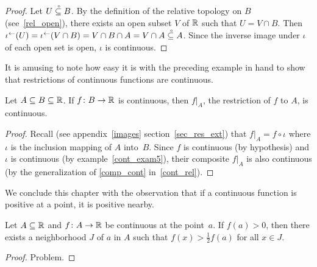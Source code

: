 \begin{proof} Let $U\overset{\thickspace{}_\circ}{\subseteq}B$.  By the definition of the relative topology on $B$ (see~\ref{rel_open}),
there exists an open subset $V$ of $\mathbb{R}$ such that $U = V \cap B$.  Then $\iota^\gets(U) =
\iota^\gets(V \cap B) = V \cap B \cap A = V \cap A\overset{\thickspace{}_\circ}{\subseteq}A$.  Since the inverse image under
$\iota$ of each open set is open, $\iota$ is continuous.
\end{proof}

It is amusing to note how easy it is with the preceding example in hand to show that
restrictions of continuous functions are continuous.

\begin{prop} Let $A \subseteq B \subseteq \mathbb{R}$.  If $f\colon B \rightarrow \mathbb{R}$ is continuous,
then $f|_A$, the restriction of $f$ to $A$, is continuous.
\end{prop}

\begin{proof} Recall (see appendix~\ref{images} section~\ref{sec_res_ext}) that $f|_A =
f \circ \iota$ where $\iota$ is the inclusion mapping of $A$ into~$B$.  Since $f$ is
continuous (by hypothesis) and $\iota$ is continuous (by example~\ref{cont_exam5}), their
composite $f|_A$ is also continuous (by the generalization of \ref{comp_cont}
in~\ref{cont_rel}).
\end{proof}

We conclude this chapter with the observation that if a continuous function is positive at a
point, it is positive nearby.

\begin{prop}\label{pos_at_pt} Let $A \subseteq \mathbb{R}$ and $f\colon A \rightarrow \mathbb{R}$ be continuous at
the point~$a$.  If $f(a)>0$, then there exists a neighborhood $J$ of $a$ in $A$ such that
$f(x) > \frac12f(a)$ for all $x \in J$.
\end{prop}

\begin{proof} Problem. \ns \end{proof}




\endinput
